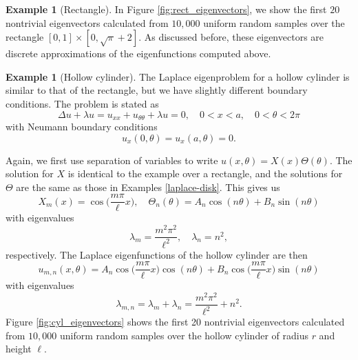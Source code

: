 \documentclass{article}
\numberwithin{equation}{section}
\theoremstyle{definition}
\newtheorem{exmp}[thm]{Example}
\begin{document}
\begin{exmp}[Rectangle]
In Figure \ref{fig:rect_eigenvectors}, we show the first $20$ nontrivial eigenvectors calculated from $10,000$ uniform random samples over the rectangle $[0,1] \times [0, \sqrt{\pi}+2]$. As discussed before, these eigenvectors are discrete approximations of the eigenfunctions computed above.
\end{exmp}

\begin{exmp}[Hollow cylinder]
The Laplace eigenproblem for a hollow cylinder is similar to that of the rectangle, but we have slightly different boundary conditions. The problem is stated as
\begin{equation}\label{laplace_eq2}
\Delta u + \lambda u = u_{xx} + u_{\theta\theta} + \lambda u = 0, \quad 0 < x < a, \quad 0 < \theta < 2\pi
\end{equation}
with Neumann boundary conditions
\begin{equation}\label{boundary_cond2}
u_x(0,\theta) = u_x(a,\theta) = 0.
\end{equation}

Again, we first use separation of variables to write $u(x,\theta) = X(x)\Theta(\theta)$. The solution for $X$ is identical to the example over a rectangle, and the solutions for $\Theta$ are the same as those in Examples \ref{laplace-disk}. This gives us
\begin{equation}
X_m(x) = \cos\Big(\frac{m\pi}{\ell}x\Big), \quad \Theta_n(\theta) = A_n\cos(n\theta) + B_n\sin(n\theta)
\end{equation}
with eigenvalues
\begin{equation}
\lambda_m = \frac{m^2\pi^2}{\ell^2}, \quad \lambda_n = n^2,
\end{equation}
respectively. The Laplace eigenfunctions of the hollow cylinder are then
\begin{equation}
u_{m,n}(x, \theta) = A_n\cos\Big(\frac{m\pi}{\ell}x\Big)\cos(n\theta) + B_n\cos\Big(\frac{m\pi}{\ell}x\Big)\sin(n\theta)
\end{equation}
with eigenvalues
\begin{equation}
\lambda_{m,n} = \lambda_m + \lambda_n = \frac{m^2\pi^2}{\ell^2} + n^2.
\end{equation}
Figure \ref{fig:cyl_eigenvectors} shows the first 20 nontrivial eigenvectors calculated from $10,000$ uniform random samples over the hollow cylinder of radius $r$ and height $\ell$.
\end{exmp}
\end{document}
